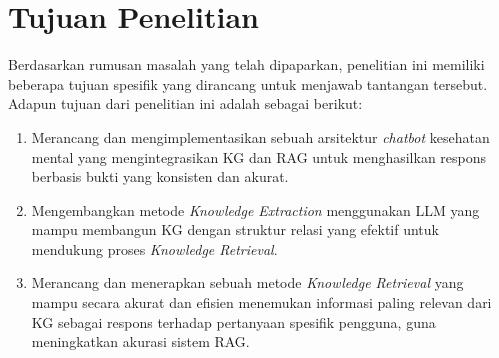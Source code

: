 \section{Tujuan Penelitian}
Berdasarkan rumusan masalah yang telah dipaparkan, penelitian ini memiliki beberapa tujuan spesifik yang dirancang untuk menjawab tantangan tersebut.
Adapun tujuan dari penelitian ini adalah sebagai berikut:
\begin{enumerate}
	\item Merancang dan mengimplementasikan sebuah arsitektur \textit{chatbot} kesehatan mental yang mengintegrasikan KG dan RAG untuk menghasilkan respons berbasis bukti yang konsisten dan akurat.
	\item Mengembangkan metode \textit{Knowledge Extraction} menggunakan LLM yang mampu membangun KG dengan struktur relasi yang efektif untuk mendukung proses \textit{Knowledge Retrieval}.
	\item Merancang dan menerapkan sebuah metode \textit{Knowledge Retrieval} yang mampu secara akurat dan efisien menemukan informasi paling relevan dari KG sebagai respons terhadap pertanyaan spesifik pengguna, guna meningkatkan akurasi sistem RAG.
\end{enumerate}
